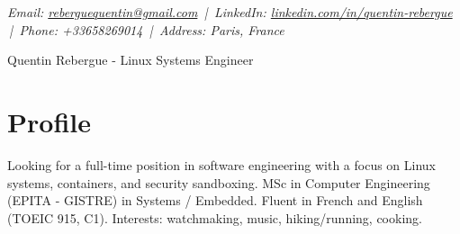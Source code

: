 \documentclass[9pt,a4paper]{article}
\newcommand{\namefont}{\fontsize{18}{22}\selectfont}
\newcommand{\tinyscript}{\fontsize{8}{8}\selectfont}
\begin{document}
\renewcommand\normalsize{\fontsize{10.5}{15}\selectfont}
\normalsize

\begin{center}
  {\tinyscript\itshape
  Email: \href{mailto:reberguequentin@gmail.com}{reberguequentin@gmail.com} \,|\,
  LinkedIn: \href{https://linkedin.com/in/quentin-rebergue}{linkedin.com/in/quentin-rebergue} \,|\,
  Phone: +33658269014 \,|\,
  Address: Paris, France}
\end{center}

\begin{center}
  {\namefont Quentin Rebergue - Linux Systems Engineer}
\end{center}

\section*{Profile}
\begin{tcolorbox}[mybox2]
Looking for a full-time position in software engineering with a focus on Linux systems, containers, and security sandboxing. MSc in Computer Engineering (EPITA - GISTRE) in Systems / Embedded. Fluent in French and English (TOEIC 915, C1). Interests: watchmaking, music, hiking/running, cooking.
\end{tcolorbox}
\end{document}
